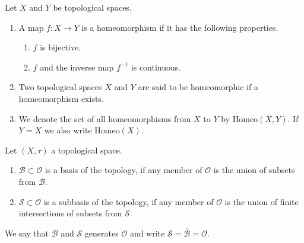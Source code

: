 \begin{defbox}
    \begin{definition}[Homeomorphism]
        Let \(X\) and \(Y\) be {\color{mathif}topological spaces}.
        \begin{enumerate}
            \item A {\color{mathobj}map} \(f: X \longrightarrow Y\) is a {\color{maththen}homeomorphism} if it has the following properties.

            \begin{enumerate}
                \item \(f\) is {\color{mathif}bijective}.
                \item \(f\) and the {\color{mathif}inverse map} \(f^{-1}\) is {\color{mathif}continuous}.
            \end{enumerate}

            \item Two topological spaces \(X\) and \(Y\) are said to be {\color{maththen}homeomorphic} if a homeomorphism exists.

            \item We denote the set of all homeomorphisms from \(X\) to \(Y\) by \(\mathrm{Homeo}(X, Y)\). If \(Y = X\) we also write \(\mathrm{Homeo}(X)\).
        \end{enumerate}
    \end{definition}
\end{defbox}

\begin{defbox}
    \begin{definition}[Homeomorphism]
        Let \((X, \tau)\) a {\color{mathif}topological space}.
        \begin{enumerate}
            \item \(\mathcal{B} \subset \mathcal{O}\) is a {\color{maththen}basis} of the topology, if any member of \(\mathcal{O}\) is the {\color{mathif}union of subsets} from \(\mathcal{B}\).
            \item \(\mathcal{S} \subset \mathcal{O}\) is a {\color{maththen}subbasis} of the topology, if any member of \(\mathcal{O}\) is the {\color{mathif}union of finite intersections of subsets} from \(\mathcal{S}\).
        \end{enumerate}
        We say that \(\mathcal{B}\) and \(\mathcal{S}\) {\color{maththen}generates} \(\mathcal{O}\) and write \(\overline{\mathcal{S}} = \overline{\mathcal{B}} = \mathcal{O}\).
    \end{definition}
\end{defbox}

